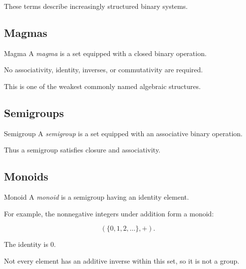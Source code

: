 These terms describe increasingly structured binary systems.

\subsection{Magmas}
\label{subsec:magmas}

\begin{definitionbox}{Magma}
A \emph{magma} is a set equipped with a closed binary operation.
\end{definitionbox}

No associativity, identity, inverses, or commutativity are required.

This is one of the weakest commonly named algebraic structures.

\subsection{Semigroups}
\label{subsec:semigroups}

\begin{definitionbox}{Semigroup}
A \emph{semigroup} is a set equipped with an associative binary operation.
\end{definitionbox}

Thus a semigroup satisfies closure and associativity.

\subsection{Monoids}
\label{subsec:monoids}

\begin{definitionbox}{Monoid}
A \emph{monoid} is a semigroup having an identity element.
\end{definitionbox}

For example, the nonnegative integers under addition form a monoid:

\[ (\{0,1,2,\ldots\},+). \]

The identity is \(0\).

Not every element has an additive inverse within this set, so it is not a
group.

